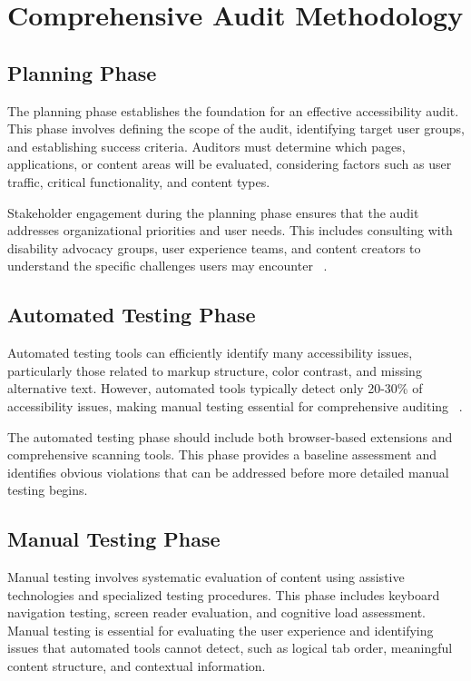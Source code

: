 \section{Comprehensive Audit Methodology}
\label{sec:audit-methodology}

\subsection{Planning Phase}

The planning phase establishes the foundation for an effective accessibility audit. This phase involves defining the scope of the audit, identifying target user groups, and establishing success criteria. Auditors must determine which pages, applications, or content areas will be evaluated, considering factors such as user traffic, critical functionality, and content types.

Stakeholder engagement during the planning phase ensures that the audit addresses organizational priorities and user needs. This includes consulting with disability advocacy groups, user experience teams, and content creators to understand the specific challenges users may encounter~ \cite{DisabilityRightsAuditing}.

\subsection{Automated Testing Phase}

Automated testing tools can efficiently identify many accessibility issues, particularly those related to markup structure, color contrast, and missing alternative text. However, automated tools typically detect only 20-30\% of accessibility issues, making manual testing essential for comprehensive auditing~ \cite{WebAIMSurvey}.

The automated testing phase should include both browser-based extensions and comprehensive scanning tools. This phase provides a baseline assessment and identifies obvious violations that can be addressed before more detailed manual testing begins.

\subsection{Manual Testing Phase}

Manual testing involves systematic evaluation of content using assistive technologies and specialized testing procedures. This phase includes keyboard navigation testing, screen reader evaluation, and cognitive load assessment. Manual testing is essential for evaluating the user experience and identifying issues that automated tools cannot detect, such as logical tab order, meaningful content structure, and contextual information.

